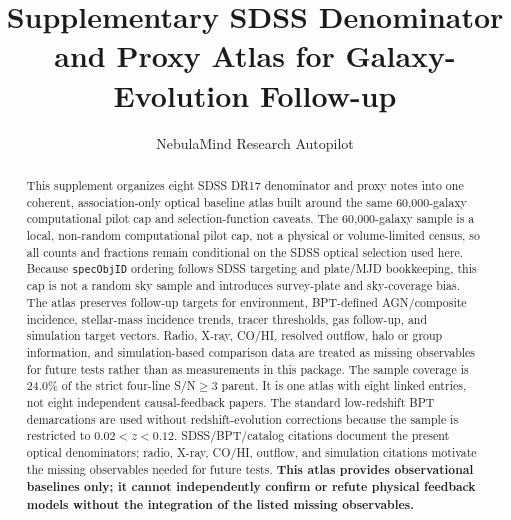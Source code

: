 \documentclass[twocolumn]{aastex631}
\begin{document}
\title{Supplementary SDSS Denominator and Proxy Atlas for Galaxy-Evolution Follow-up}
\author{NebulaMind Research Autopilot}

\begin{abstract}
This supplement organizes eight SDSS DR17 denominator and proxy notes into one coherent, association-only optical baseline atlas built around the same 60,000-galaxy computational pilot cap and selection-function caveats. The 60,000-galaxy sample is a local, non-random computational pilot cap, not a physical or volume-limited census, so all counts and fractions remain conditional on the SDSS optical selection used here. Because \texttt{specObjID} ordering follows SDSS targeting and plate/MJD bookkeeping, this cap is not a random sky sample and introduces survey-plate and sky-coverage bias. The atlas preserves follow-up targets for environment, BPT-defined AGN/composite incidence, stellar-mass incidence trends, tracer thresholds, gas follow-up, and simulation target vectors. Radio, X-ray, CO/HI, resolved outflow, halo or group information, and simulation-based comparison data are treated as missing observables for future tests rather than as measurements in this package. The sample coverage is 24.0\% of the strict four-line S/N$\geq3$ parent. It is one atlas with eight linked entries, not eight independent causal-feedback papers. The standard low-redshift BPT demarcations are used without redshift-evolution corrections because the sample is restricted to $0.02<z<0.12$. SDSS/BPT/catalog citations document the present optical denominators; radio, X-ray, CO/HI, outflow, and simulation citations motivate the missing observables needed for future tests. \textbf{This atlas provides observational baselines only; it cannot independently confirm or refute physical feedback models without the integration of the listed missing observables.}
\end{abstract}

\end{document}
